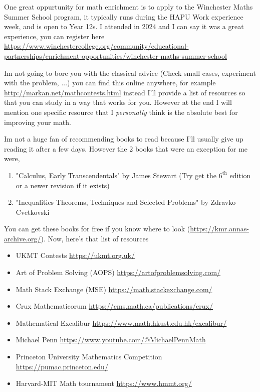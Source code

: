 \documentclass{article}
\begin{document}
One great oppurtunity for math enrichment is to apply to the Winchester Maths Summer School program, it typically runs during the HAPU Work experience week, and is open to Year 12s.
I attended in 2024 and I can say it was a great experience, you can register here \url{https://www.winchestercollege.org/community/educational-partnerships/enrichment-opportunities/winchester-maths-summer-school}
\vspace{0.2cm}

Im not going to bore you with the classical advice (Check small cases, experiment with the problem, ...) you can find this online anywhere, for example \url{http://markan.net/mathcontests.html} instead I'll provide a list of resources so that you can study
in a way that works for you. However at the end I will mention one specific resource that I \textit{personally} think is the absolute best for improving your math.

Im not a huge fan of recommending books to read because I'll usually give up reading it after a few days. However the 2 books that were an exception for me were,

\begin{enumerate}
\item "Calculus, Early Transcendentals" by James Stewart (Try get the $6^{\text{th}}$ edition or a newer revision if it exists)
\item "Inequalities Theorems, Techniques and Selected Problems" by Zdravko Cvetkovski
\end{enumerate}

\noindent
You can get these books for free if you know where to look (\url{https://kmr.annas-archive.org/}). Now, here's that list of resources

\begin{itemize}
\item UKMT Contests \url{https://ukmt.org.uk/}
\item Art of Problem Solving (AOPS) \url{https://artofproblemsolving.com/}
\item Math Stack Exchange (MSE) \url{https://math.stackexchange.com/}
\item Crux Mathematicorum \url{https://cms.math.ca/publications/crux/}
\item Mathematical Excalibur \url{https://www.math.hkust.edu.hk/excalibur/}
\item Michael Penn \url{https://www.youtube.com/@MichaelPennMath}
\item Princeton University Mathematics Competition \url{https://pumac.princeton.edu/}
\item Harvard-MIT Math tournament \url{https://www.hmmt.org/}
\end{itemize}
\end{document}

